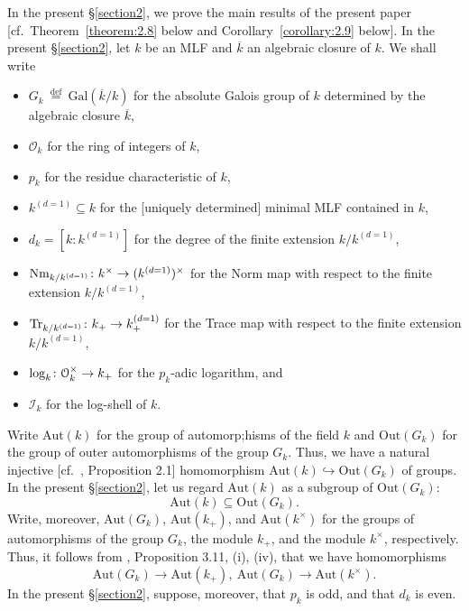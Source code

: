 \documentclass[11pt,showkeys]{article}
\theoremstyle{theorem}
\theoremstyle{definition}
\def\CalO{{\mathcal O}}
\def\Aut{{\mbox{Aut}}}
\def\defeq{ \ {\stackrel{\mathrm{def}}{=}} \ }
\begin{document}
In the present \S\ref{section2}, we prove the main results of the present paper [cf.\ Theorem~\ref{theorem:2.8} below and Corollary~\ref{corollary:2.9} below]. In  the present \S \ref{section2}, let $k$ be an MLF and $\overline{k}$ an algebraic closure of $k$. 
We shall write
\begin{itemize}
  \item $G_k \defeq \mathrm{Gal}(\overline{k}/k)$ for the absolute Galois group of $k$ determined by the algebraic closure $\overline{k}$, 
  \item $\CalO_k$ for the ring of integers of $k$,
  \item $p_k$ for the residue characteristic of $k$,
  \item $k^{(d=1)} \subseteq k$ for the [uniquely determined] minimal MLF contained in $k$,
  \item $d_k = [k:k^{(d=1)}]$ for the degree of the finite extension $k/k^{(d=1)}$, 
  \item ${\rm Nm}_{k/k^{(d=1)}}\colon k^\times \to (k^{(d = 1)})^\times $ for the Norm map with respect to the finite extension $k/k^{(d=1)}$, 
  \item ${\rm Tr}_{k/k^{(d=1)}}\colon k_+ \to k^{(d = 1)}_+ $ for the Trace map with respect to the finite extension $k/k^{(d=1)}$,  
  \item ${\rm log}_k \colon \CalO^{\times}_k \rightarrow k_+$ for the $p_k$-adic logarithm, and 
  \item $\mathcal{I}_k$ for the log-shell of $k$. 
\end{itemize}
Write $\mathrm{Aut}(k)$ for the group of automorp;hisms of the field $k$ and $\mathrm{Out}(G_k)$ for the group of outer automorphisms of the group $G_k$.  Thus, we have a natural injective [cf.\ \cite{Hoshi1}, Proposition 2.1] homomorphism $\mathrm{Aut}(k) \hookrightarrow \mathrm{Out}(G_k)$ of groups.  In the present \S \ref{section2}, let us regard $\mathrm{Aut}(k)$ as a subgroup of $\mathrm{Out}(G_k)$:  
\[
\mathrm{Aut}(k) \subseteq \mathrm{Out}(G_k).  
\]
Write, moreover, $\mathrm{Aut}(G_k)$, $\mathrm{Aut}(k_+)$, and $\mathrm{Aut}(k^\times)$ for the groups of automorphisms of the group $G_k$, the module $k_+$, and the module $k^\times$, respectively.  Thus, it follows from \cite{Hoshi1}, Proposition 3.11, (i), (iv), that we have homomorphisms 
\begin{equation}
\Aut(G_k) \longrightarrow \Aut(k_+), \ \Aut(G_k) \longrightarrow \Aut(k^\times). \nonumber
\end{equation}
In the present \S \ref{section2}, suppose, moreover, that $p_k$ is odd, and that $d_k$ is even.
\end{document}
